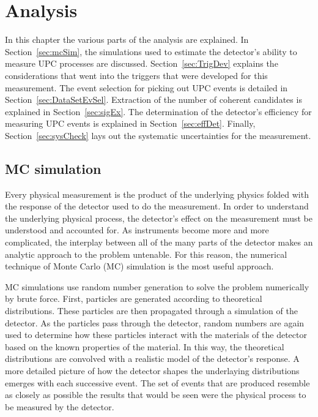 \chapter{Analysis}
  In this chapter the various parts of the analysis are explained. 
  In Section~\ref{sec:mcSim}, the simulations used to estimate the detector's 
    ability to measure UPC processes are discussed. 
  Section~\ref{sec:TrigDev} explains the considerations that went into the 
    triggers that were developed for this measurement.
  The event selection for picking out UPC events is detailed in 
    Section~\ref{sec:DataSetEvSel}.
  Extraction of the number of coherent \JPsi{} candidates is explained in 
    Section~\ref{sec:sigEx}.
  The determination of the detector's efficiency for measuring UPC events is 
    explained in Section~\ref{sec:effDet}.
  Finally, Section~\ref{sec:sysCheck} lays out the systematic uncertainties 
    for the measurement.

  \section{\label{sec:mcSim} MC simulation}
    Every physical measurement is the product of the underlying physics 
      folded with the response of the detector used to do the measurement. 
    In order to understand the underlying physical process, the detector's 
      effect on the measurement must be understood and accounted for. 
    As instruments become more and more complicated, the interplay between all
      of the many parts of the detector makes an analytic approach to the 
      problem untenable.
    For this reason, the numerical technique of Monte Carlo (MC) simulation is
      the most useful approach.

    MC simulations use random number generation to solve the problem 
      numerically by brute force. 
    First, particles are generated according to theoretical distributions.
    These particles are then propagated through a simulation of the detector.
    As the particles pass through the detector, random numbers are again used
      to determine how these particles interact with the materials of the 
      detector based on the known properties of the material. 
    In this way, the theoretical distributions are convolved with a realistic 
      model of the detector's response. 
    A more detailed picture of how the detector shapes the underlaying 
      distributions emerges with each successive event. 
    The set of events that are produced resemble as closely as possible the 
      results that would be seen were the physical process to be measured 
      by the detector.
    
